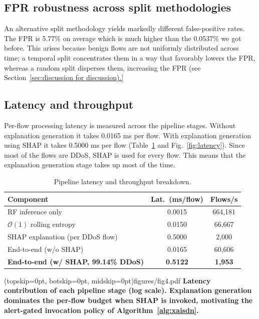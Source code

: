 \documentclass{ieeeaccess}
\begin{document}
\subsection{FPR robustness across split methodologies}
An alternative split methodology yields markedly different false-positive rates. The FPR is 5.77\% on average which is much higher than the 0.0537\% we got before. This arises because benign flows are not uniformly distributed across time; a temporal split concentrates them in a way that favorably lowers the FPR, whereas a random split disperses them, increasing the FPR (see Section~\ref{sec:discussion for discussion).}

\subsection{Latency and throughput}
Per-flow processing latency is measured across the pipeline stages. Without explanation generation it takes 0.0165 ms per flow. With explanation generation using SHAP it takes 0.5000 ms per flow (Table~\ref{tab:latency} and Fig.~\ref{fig:latency}). Since most of the flows are DDoS, SHAP is used for every flow. This means that the explanation generation stage takes up most of the time.

\begin{table}
\caption{Pipeline latency and throughput breakdown.}
\centering
\label{tab:latency}
\small
\setlength{\tabcolsep}{4pt}
\begin{tabular}{@{}lcc@{}}
\toprule
\textbf{Component} & \textbf{Lat.\ (ms/flow)} & \textbf{Flows/s} \\
\midrule
RF inference only & 0.0015 & 664,181 \\
$\mathcal{O}(1)$ rolling entropy & 0.0150 & 66,667 \\
SHAP explanation (per DDoS flow) & 0.5000 & 2,000 \\
End-to-end (w/o SHAP) & 0.0165 & 60,606 \\
\textbf{End-to-end (w/ SHAP, 99.14\% DDoS)} & \textbf{0.5122} & \textbf{1,953} \\
\bottomrule
\end{tabular}
\end{table}

\Figure[t!](topskip=0pt, botskip=0pt, midskip=0pt){figures/fig4.pdf}
{ \textbf{Latency contribution of each pipeline stage (log scale). Explanation generation dominates the per-flow budget when SHAP is invoked, motivating the alert-gated invocation policy of Algorithm~\ref{alg:xaisdn}.}\label{fig:latency}}
\end{document}
